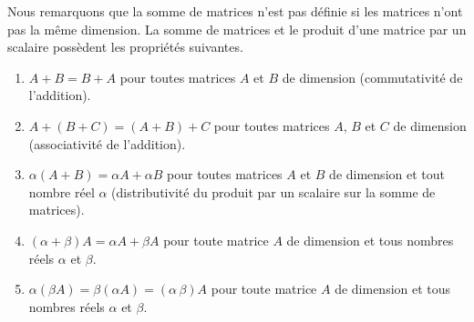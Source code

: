 {Nous remarquons que la somme de matrices n'est pas définie si les matrices
n'ont pas la même dimension.  La somme de matrices et le produit
d'une matrice par un scalaire possèdent les propriétés suivantes.

\begin{focus}{\prp}
\begin{enumerate}
\item $A+B = B+A$ pour toutes matrices $A$ et $B$ de dimension
 (commutativité de l'addition).
\item $A+(B+C) = (A+B)+C$ pour toutes matrices $A$, $B$ et $C$ de
dimension  (associativité de l'addition). 
\item $\alpha(A+B) = \alpha A + \alpha B$ pour toutes matrices $A$ et
$B$ de dimension  et tout nombre réel $\alpha$
(distributivité du produit par un scalaire sur la somme de matrices).
\item $(\alpha+\beta) A = \alpha A + \beta A$ pour toute matrice $A$
de dimension  et tous nombres réels $\alpha$ et $\beta$.
\item $\alpha (\beta A) = \beta (\alpha A) = (\alpha\,\beta) A$ pour
toute matrice $A$ de dimension  et tous nombres réels
$\alpha$ et $\beta$.
\end{enumerate}
\end{focus}

}
